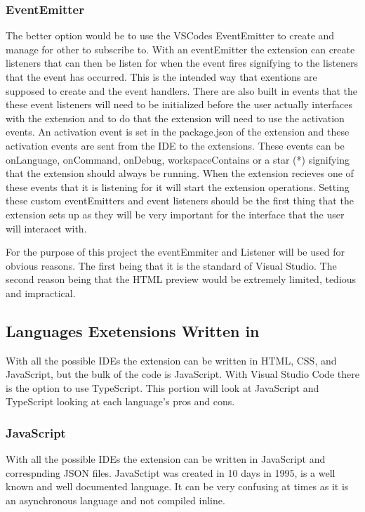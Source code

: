 \documentclass[letterpaper,10pt,titlepage,draftclsnofoot,onecolumn,onesided] {IEEEtran}
\begin{document}
\subsubsection{EventEmitter}
The better option would be to use the VSCodes EventEmitter to create and manage for other to subscribe to. 
With an eventEmitter the extension can create listeners that can then be listen for when the event fires signifying to the listeners that the event has occurred. 
This is the intended way that exentions are supposed to create and the event handlers. 
There are also built in events that the these event listeners will need to be initialized before the user actually interfaces with the extension and to do that the extension will need to use the activation events. 
An activation event is set in the package.json of the extension and these activation events are sent from the IDE to the extensions.
These events can be onLanguage, onCommand, onDebug, workspaceContains or a star (*) signifying that the extension should always be running. 
When the extension recieves one of these events that it is listening for it will start the extension operations. 
Setting these custom eventEmitters and event listeners should be the first thing that the extension sets up as they will be very important for the interface that the user will interacet with. \cite{VSCode Documentation}

For the purpose of this project the eventEmmiter and Listener will be used for obvious reasons. 
The first being that it is the standard of Visual Studio. 
The second reason being that the HTML preview would be extremely limited, tedious and impractical.

\subsection{Languages Exetensions Written in}
With all the possible IDEs the extension can be written in HTML, CSS, and JavaScript, but the bulk of the code is  JavaScript. 
With Visual Studio Code there is the option to use TypeScript. 
This portion will look at JavaScript and TypeScript looking at each language's pros and cons.
\subsubsection{JavaScript}
With all the possible IDEs the extension can be written in JavaScript  and correspnding JSON files. 
JavaSctipt was created in 10 days in 1995, is a well known and well documented language. \cite{JavaScript History}
It can be very confusing at times as it is an asynchronous language and not compiled inline.
\end{document}
